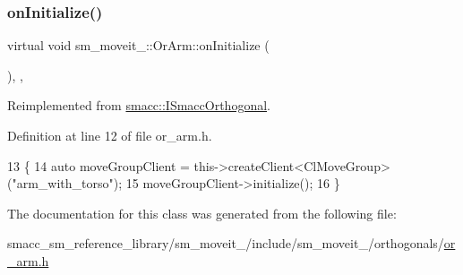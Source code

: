 \subsubsection{\texorpdfstring{on\+Initialize()}{onInitialize()}}
{\footnotesize\ttfamily virtual void sm\+\_\+moveit\+\_\+::\+Or\+Arm\+::on\+Initialize (\begin{DoxyParamCaption}{ }\end{DoxyParamCaption})\hspace{0.3cm}{\ttfamily [inline]}, {\ttfamily [override]}, {\ttfamily [virtual]}}



Reimplemented from \hyperlink{classsmacc_1_1ISmaccOrthogonal_a6bb31c620cb64dd7b8417f8705c79c7a}{smacc\+::\+I\+Smacc\+Orthogonal}.



Definition at line 12 of file or\+\_\+arm.\+h.


\begin{DoxyCode}
13     \{
14         \textcolor{keyword}{auto} moveGroupClient = this->createClient<ClMoveGroup>(\textcolor{stringliteral}{"arm\_with\_torso"});
15         moveGroupClient->initialize();
16     \}
\end{DoxyCode}


The documentation for this class was generated from the following file\+:\begin{DoxyCompactItemize}
\item 
smacc\+\_\+sm\+\_\+reference\+\_\+library/sm\+\_\+moveit\+\_/include/sm\+\_\+moveit\+\_/orthogonals/\hyperlink{3_2include_2sm__moveit__3_2orthogonals_2or__arm_8h}{or\+\_\+arm.\+h}\end{DoxyCompactItemize}
